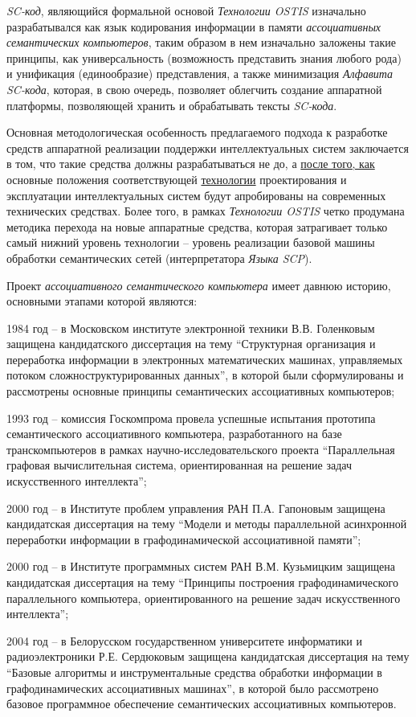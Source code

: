 \textit{SC-код}, являющийся формальной основой \textit{Технологии OSTIS} изначально разрабатывался как язык кодирования информации в памяти \textit{ассоциативных семантических компьютеров}, таким образом в нем изначально заложены такие принципы, как универсальность (возможность представить знания любого рода) и унификация (единообразие) представления, а также минимизация \textit{Алфавита SC-кода}, которая, в свою очередь, позволяет облегчить создание аппаратной платформы, позволяющей хранить и обрабатывать тексты \textit{SC-кода}.

Основная методологическая особенность предлагаемого подхода к разработке средств аппаратной реализации поддержки интеллектуальных систем заключается в том, что такие средства должны разрабатываться не до, а \underline{после того, как} основные положения соответствующей \underline{технологии} проектирования и эксплуатации интеллектуальных систем будут апробированы на современных технических средствах. Более того, в рамках \textit{\textit{Технологии OSTIS}} четко продумана методика перехода на новые аппаратные средства, которая затрагивает только самый нижний уровень технологии -- уровень реализации базовой машины обработки семантических сетей (интерпретатора \textit{Языка SCP}).



Проект \textit{ассоциативного семантического компьютера} имеет давнюю историю, основными этапами которой являются:
\begin{textitemize}
\item 1984 год -- в Московском  институте электронной техники В.В. Голенковым защищена кандидатского диссертация на тему ``Структурная организация и переработка информации в электронных математических машинах, управляемых потоком сложноструктурированных данных'', в которой были сформулированы и рассмотрены основные принципы семантических ассоциативных компьютеров;
\item 1993 год -- комиссия Госкомпрома провела успешные испытания прототипа семантического ассоциативного компьютера, разработанного на базе транскомпьютеров в рамках научно-исследовательского проекта ``Параллельная графовая вычислительная система, ориентированная на решение задач искусственного интеллекта'';

\item 2000 год -- в Институте проблем управления РАН П.А. Гапоновым защищена кандидатская диссертация на тему ``Модели и методы параллельной асинхронной переработки информации в графодинамической ассоциативной памяти'';
\item 2000 год -- в Институте программных систем РАН В.М. Кузьмицким защищена кандидатская диссертация на тему ``Принципы построения графодинамического параллельного компьютера, ориентированного на решение задач искусственного интеллекта'';
\item 2004 год -- в Белорусском государственном университете информатики и радиоэлектроники Р.Е. Сердюковым защищена кандидатская диссертация на тему ``Базовые алгоритмы и инструментальные средства обработки информации в графодинамических ассоциативных машинах'', в которой было рассмотрено базовое программное обеспечение семантических ассоциативных компьютеров.
\end{textitemize}

